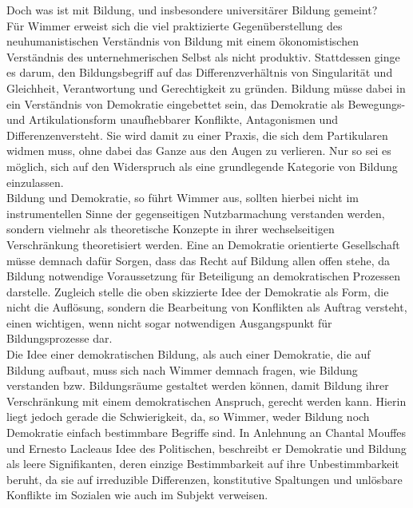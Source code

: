 \noindent Doch was ist mit Bildung, und insbesondere universitärer
Bildung gemeint? \\
Für Wimmer erweist sich die viel praktizierte Gegenüberstellung des
neuhumanistischen Verständnis von Bildung mit einem ökonomistischen Verständnis
des unternehmerischen Selbst als nicht produktiv. Stattdessen ginge es darum,
\glqq den Bildungsbegriff auf das Differenzverhältnis von Singularität und
Gleichheit, Verantwortung und Gerechtigkeit zu gründen.\grqq\footnotemark
{} Bildung müsse dabei
in ein Verständnis von Demokratie eingebettet sein, das Demokratie als
\glqq Bewegungs- und Artikulationsform unaufhebbarer Konflikte, Antagonismen und
Differenzen\grqq versteht. Sie wird damit zu einer Praxis, die sich dem
Partikularen widmen muss, ohne dabei das Ganze aus den Augen zu verlieren. Nur
so sei es möglich, sich auf den Widerspruch als eine grundlegende Kategorie von
Bildung einzulassen.\\
Bildung und Demokratie, so führt Wimmer aus, sollten
hierbei nicht im instrumentellen Sinne der gegenseitigen Nutzbarmachung
verstanden werden, sondern vielmehr als theoretische Konzepte in ihrer
wechselseitigen Verschränkung theoretisiert werden. Eine an Demokratie
orientierte Gesellschaft müsse demnach dafür Sorgen, dass das Recht auf Bildung
allen offen stehe, da Bildung notwendige Voraussetzung für Beteiligung an
demokratischen Prozessen darstelle. Zugleich stelle die oben skizzierte Idee
der Demokratie als Form, die nicht die Auflösung, sondern die Bearbeitung von
Konflikten als Auftrag versteht, einen wichtigen, wenn nicht sogar notwendigen
Ausgangspunkt für Bildungsprozesse dar.\footnotemark {}\\
Die Idee einer demokratischen Bildung,
als auch einer Demokratie, die auf Bildung aufbaut, muss sich nach Wimmer
demnach fragen, wie Bildung verstanden bzw. Bildungsräume gestaltet werden
können, damit Bildung ihrer Verschränkung mit einem demokratischen Anspruch,
gerecht werden kann. Hierin liegt jedoch gerade die Schwierigkeit, da, so
Wimmer, weder Bildung noch Demokratie einfach bestimmbare Begriffe sind. In
Anlehnung an Chantal Mouffes und Ernesto Lacleaus Idee des Politischen,
beschreibt er Demokratie und Bildung als leere Signifikanten, deren einzige
Bestimmbarkeit auf ihre Unbestimmbarkeit beruht, da sie \glqq auf irreduzible
Differenzen, konstitutive Spaltungen und unlösbare Konflikte im Sozialen wie
auch im Subjekt\grqq\footnotemark {} verweisen.\\ 

